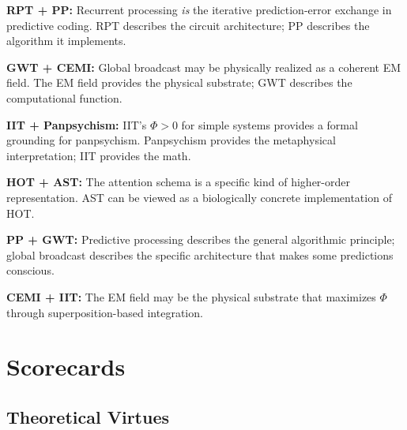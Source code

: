 \documentclass[11pt,a4paper]{report}
\begin{document}
\begin{convergebox}
\textbf{RPT + PP:} Recurrent processing \emph{is} the iterative prediction-error exchange in predictive coding. RPT describes the circuit architecture; PP describes the algorithm it implements.

\textbf{GWT + CEMI:} Global broadcast may be physically realized as a coherent EM field. The EM field provides the physical substrate; GWT describes the computational function.

\textbf{IIT + Panpsychism:} IIT's $\Phi > 0$ for simple systems provides a formal grounding for panpsychism. Panpsychism provides the metaphysical interpretation; IIT provides the math.

\textbf{HOT + AST:} The attention schema is a specific kind of higher-order representation. AST can be viewed as a biologically concrete implementation of HOT.

\textbf{PP + GWT:} Predictive processing describes the general algorithmic principle; global broadcast describes the specific architecture that makes some predictions conscious.

\textbf{CEMI + IIT:} The EM field may be the physical substrate that maximizes $\Phi$ through superposition-based integration.
\end{convergebox}


\chapter{Scorecards}

\section{Theoretical Virtues}
\end{document}
